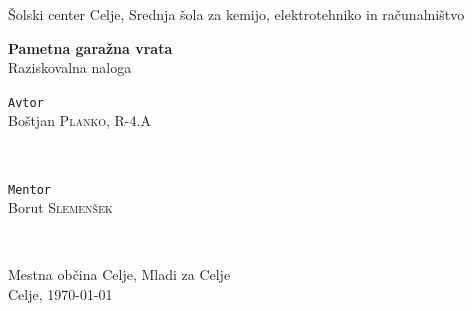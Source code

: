 \documentclass[11pt]{article}
\begin{document}
\begin{titlepage}
\thispagestyle{empty}
   \center
   \fancyhead{}
   \large{Šolski center Celje, Srednja šola za kemijo, elektrotehniko in računalništvo}\\[1.5cm]
   \vspace*{\fill}
   \begin{center}
   \Huge{\bfseries Pametna garažna vrata}\\
   \vspace{1mm}
   \large{Raziskovalna naloga}
   \end{center}
   \vspace*{\fill}

	\begin{minipage}{0.4\textwidth}
		\begin{flushleft}
		\vspace{4.5mm}
			\large
			\texttt{Avtor}\\
			Boštjan \textsc{Planko}, R-4.A \\ %
		\end{flushleft}
	\end{minipage}
	~
	\begin{minipage}{0.5\textwidth}
		\begin{flushright}
			\large
			\texttt{Mentor}\\
			Borut \textsc{Slemenšek} %
		\end{flushright}
	\end{minipage}
	~
	\begin{minipage}{0.5\textwidth}
		\begin{center}
		    \vspace{5mm}
		    Mestna občina Celje, Mladi za Celje\\
			\large{Celje, \monthyeardate\today}
		\end{center}
	\end{minipage}
	\fancyfoot{}
\end{titlepage}
\end{document}
